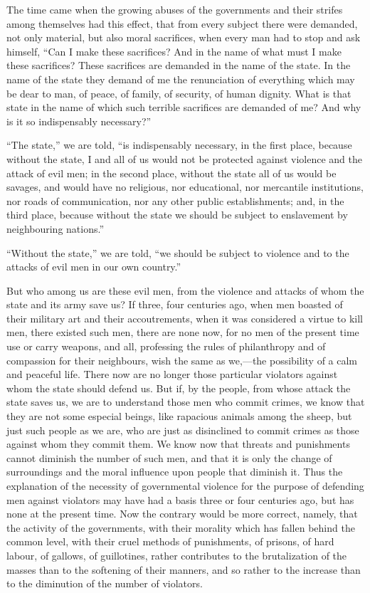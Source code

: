 \documentclass{book}
\begin{document}
The time came when the growing abuses of the governments and their strifes among themselves had this effect, that from every subject there were demanded, not only material, but also moral sacrifices, when every man had to stop and ask himself, “Can I make these sacrifices? And in the name of what must I make these sacrifices? These sacrifices are demanded in the name of the state. In the name of the state they demand of me the renunciation of everything which may be dear to man, of peace, of family, of security, of human dignity. What is that state in the name of which such terrible sacrifices are demanded of me? And why is it so indispensably necessary?”

“The state,” we are told, “is indispensably necessary, in the first place, because without the state, I and all of us would not be protected against violence and the attack of evil men; in the second place, without the state all of us would be savages, and would have no religious, nor educational, nor mercantile institutions, nor roads of communication, nor any other public establishments; and, in the third place, because without the state we should be subject to enslavement by neighbouring nations.”

“Without the state,” we are told, “we should be subject to violence and to the attacks of evil men in our own country.”

But who among us are these evil men, from the violence and attacks of whom the state and its army save us? If three, four centuries ago, when men boasted of their military art and their accoutrements, when it was considered a virtue to kill men, there existed such men, there are none now, for no men of the present time use or carry weapons, and all, professing the rules of philanthropy and of compassion for their neighbours, wish the same as we,—the possibility of a calm and peaceful life. There now are no longer those particular violators against whom the state should defend us. But if, by the people, from whose attack the state saves us, we are to understand those men who commit crimes, we know that they are not some especial beings, like rapacious animals among the sheep, but just such people as we are, who are just as disinclined to commit crimes as those against whom they commit them. We know now that threats and punishments cannot diminish the number of such men, and that it is only the change of surroundings and the moral influence upon people that diminish it. Thus the explanation of the necessity of governmental violence for the purpose of defending men against violators may have had a basis three or four centuries ago, but has none at the present time. Now the contrary would be more correct, namely, that the activity of the governments, with their morality which has fallen behind the common level, with their cruel methods of punishments, of prisons, of hard labour, of gallows, of guillotines, rather contributes to the brutalization of the masses than to the softening of their manners, and so rather to the increase than to the diminution of the number of violators.
\end{document}
